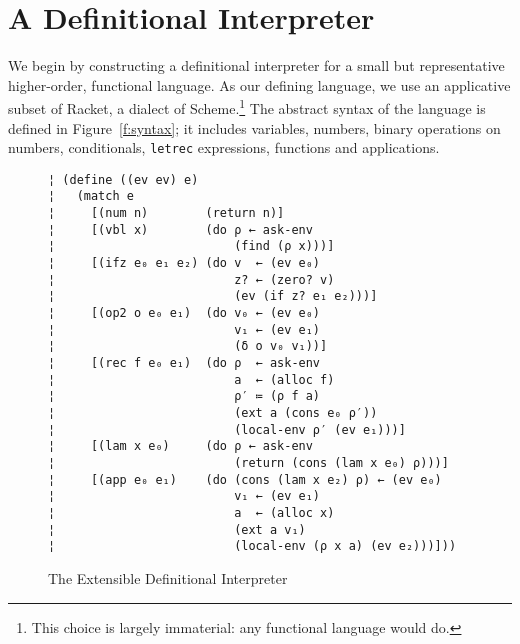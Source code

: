 \section{A Definitional Interpreter}\label{s:interp}

We begin by constructing a definitional interpreter for a small but
representative higher-order, functional language.  As our defining language, we
use an applicative subset of Racket, a dialect of Scheme.\footnote{This choice
  is largely immaterial: any functional language would do.} The abstract syntax
of the language is defined in Figure~\ref{f:syntax}; it includes variables,
numbers, binary operations on numbers, conditionals, {\tt letrec} expressions,
functions and applications.

\begin{figure} %
\begin{lstlisting}
¦ (define ((ev ev) e)
¦   (match e
¦     [(num n)        (return n)]
¦     [(vbl x)        (do ρ ← ask-env
¦                         (find (ρ x)))]    
¦     [(ifz e₀ e₁ e₂) (do v  ← (ev e₀)
¦                         z? ← (zero? v)
¦                         (ev (if z? e₁ e₂)))]
¦     [(op2 o e₀ e₁)  (do v₀ ← (ev e₀)
¦                         v₁ ← (ev e₁)
¦                         (δ o v₀ v₁))]
¦     [(rec f e₀ e₁)  (do ρ  ← ask-env
¦                         a  ← (alloc f)
¦                         ρ′ ≔ (ρ f a)
¦                         (ext a (cons e₀ ρ′))
¦                         (local-env ρ′ (ev e₁)))]
¦     [(lam x e₀)     (do ρ ← ask-env
¦                         (return (cons (lam x e₀) ρ)))]
¦     [(app e₀ e₁)    (do (cons (lam x e₂) ρ) ← (ev e₀)
¦                         v₁ ← (ev e₁)
¦                         a  ← (alloc x)         
¦                         (ext a v₁)
¦                         (local-env (ρ x a) (ev e₂)))]))
\end{lstlisting}
\vspace{-0.75em}
\caption{The Extensible Definitional Interpreter}
\label{f:interpreter}
\vspace{-1em}
\end{figure} %

